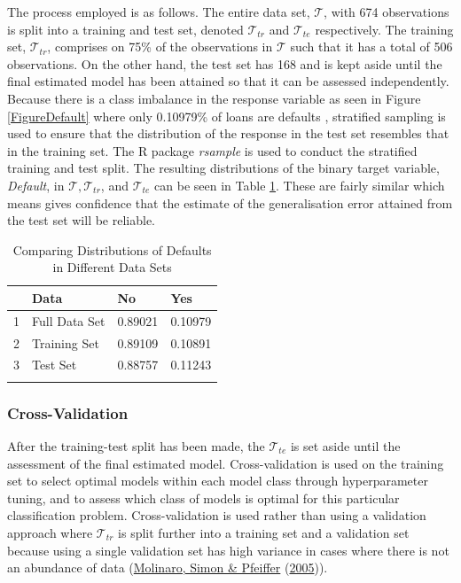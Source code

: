 \documentclass[11pt,preprint, authoryear]{elsarticle}
\numberwithin{equation}{section}
\numberwithin{figure}{section}
\numberwithin{table}{section}
\begin{document}
The process employed is as follows. The entire data set,
\(\mathcal{T}\), with 674 observations is split into a training and test
set, denoted \(\mathcal{T}_{tr}\) and \(\mathcal{T}_{te}\) respectively.
The training set, \(\mathcal{T}_{tr}\), comprises on 75\% of the
observations in \(\mathcal{T}\) such that it has a total of 506
observations. On the other hand, the test set has 168 and is kept aside
until the final estimated model has been attained so that it can be
assessed independently. Because there is a class imbalance in the
response variable as seen in Figure \ref{FigureDefault} where only
0.10979\% of loans are defaults , stratified sampling is used to ensure
that the distribution of the response in the test set resembles that in
the training set. The R package \emph{rsample} is used to conduct the
stratified training and test split. The resulting distributions of the
binary target variable, \emph{Default}, in
\(\mathcal{T}, \mathcal{T}_{tr}\), and \(\mathcal{T}_{te}\) can be seen
in Table \ref{DistributionDefaultTable}. These are fairly similar which
means gives confidence that the estimate of the generalisation error
attained from the test set will be reliable.

\begin{longtable}{rlll}
  \hline
 & Data & No & Yes \\ 
  \hline
1 & Full Data Set & 0.89021 & 0.10979 \\ 
  2 & Training Set & 0.89109 & 0.10891 \\ 
  3 & Test Set & 0.88757 & 0.11243 \\ 
   \hline
\hline
\caption{Comparing Distributions of Defaults in Different Data Sets \label{DistributionDefaultTable}} 
\end{longtable}

\hypertarget{cross-validation}{%
\subsubsection{Cross-Validation}\label{cross-validation}}

After the training-test split has been made, the \(\mathcal{T}_{te}\) is
set aside until the assessment of the final estimated model.
Cross-validation is used on the training set to select optimal models
within each model class through hyperparameter tuning, and to assess
which class of models is optimal for this particular classification
problem. Cross-validation is used rather than using a validation
approach \textemdash where \(\mathcal{T}_{tr}\) is split further into a
training set and a validation set \textemdash because using a single
validation set has high variance in cases where there is not an
abundance of data (\protect\hyperlink{ref-Molinaro}{Molinaro, Simon \&
Pfeiffer} (\protect\hyperlink{ref-Molinaro}{2005})).
\end{document}
